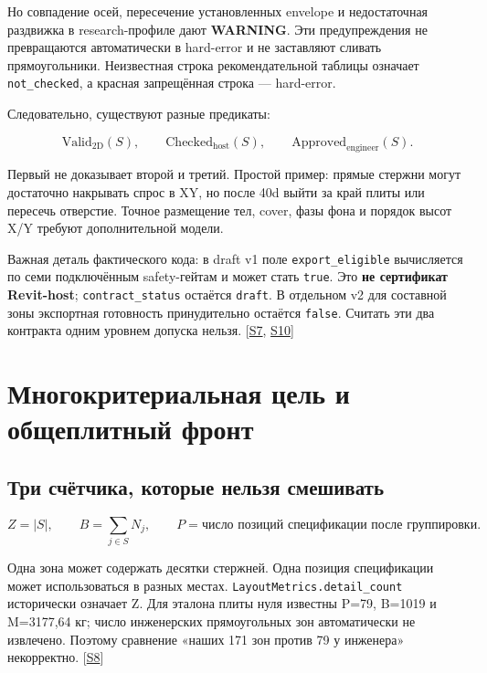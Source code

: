 \documentclass[11pt,a4paper]{article}
\begin{document}
Но совпадение осей, пересечение установленных envelope и недостаточная раздвижка в research-профиле дают \textbf{WARNING}. Эти предупреждения не превращаются автоматически в hard-error и не заставляют сливать прямоугольники. Неизвестная строка рекомендательной таблицы означает {\small\nolinkurl{not_checked}}, а красная запрещённая строка — hard-error.


Следовательно, существуют разные предикаты:


\[
\mathrm{Valid}_{\mathrm{2D}}(S),\qquad
\mathrm{Checked}_{\mathrm{host}}(S),\qquad
\mathrm{Approved}_{\mathrm{engineer}}(S).
\]

Первый не доказывает второй и третий. Простой пример: прямые стержни могут достаточно накрывать спрос в XY, но после 40d выйти за край плиты или пересечь отверстие. Точное размещение тел, cover, фазы фона и порядок высот X/Y требуют дополнительной модели.


Важная деталь фактического кода: в draft v1 поле {\small\nolinkurl{export_eligible}} вычисляется по семи подключённым safety-гейтам и может стать {\small\nolinkurl{true}}. Это \textbf{не сертификат Revit-host}; {\small\nolinkurl{contract_status}} остаётся {\small\nolinkurl{draft}}. В отдельном v2 для составной зоны экспортная готовность принудительно остаётся {\small\nolinkurl{false}}. Считать эти два контракта одним уровнем допуска нельзя. {\color{Teal}\small[\hyperlink{S7}{S7}, \hyperlink{S10}{S10}]}


\section{Многокритериальная цель и общеплитный фронт}

\subsection{Три счётчика, которые нельзя смешивать}

\[
Z=|S|,\qquad B=\sum_{j\in S}N_j,\qquad
P=\text{число позиций спецификации после группировки}.
\]

Одна зона может содержать десятки стержней. Одна позиция спецификации может использоваться в разных местах. {\small\nolinkurl{LayoutMetrics.detail_count}} исторически означает Z. Для эталона плиты нуля известны P=79, B=1019 и M=3177,64 кг; число инженерских прямоугольных зон автоматически не извлечено. Поэтому сравнение «наших 171 зон против 79 у инженера» некорректно. {\color{Teal}\small[\hyperlink{S8}{S8}]}
\end{document}
